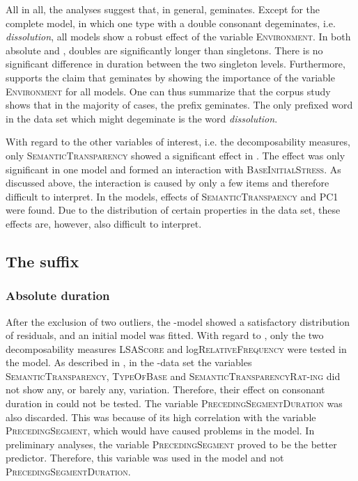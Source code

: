 All in all, the analyses suggest that, in general,  geminates. Except for the complete  model, in which one type with a double consonant degeminates, i.e. \textit{dissolution}, all  models show a robust effect of the variable \textsc{Environment}. In both absolute and , doubles are significantly longer than singletons. There is no significant difference in duration between the two singleton levels. Furthermore,  supports the claim that  geminates by showing the importance of the variable \textsc{Environment} for all models. 
One can thus summarize that the corpus study shows that in the majority of cases, the prefix  geminates. The only prefixed word in the data set which might degeminate is the word \textit{dissolution}.

With regard to the other variables of interest, i.e. the decomposability measures, only \textsc{SemanticTransparency} showed a significant effect in . The effect was only significant in one model and formed an interaction with \textsc{BaseInitialStress}. As discussed above, the interaction is  caused by only a few items and therefore difficult to interpret.
 In the  models, effects of \textsc{SemanticTranspaency} and \textsc{PC1} were found. Due to the distribution of certain properties in the data set, these effects are, however, also difficult to interpret. 


\subsection{The suffix }


\subsubsection{Absolute duration}

After the exclusion of two outliers, the -model showed a satisfactory distribution of residuals, and an initial model was fitted. 
With regard to , only the two decomposability measures \textsc{LSAScore} and log\textsc{RelativeFrequency} were tested in the model. As described in , in the -data set the variables \textsc{SemanticTransparency}, \textsc{TypeOfBase}  and \textsc{SemanticTransparencyRat-ing} did not show any, or barely any, variation. Therefore, their effect on consonant duration in  could not be tested. The variable \textsc{PrecedingSegmentDuration} was also discarded. This was because of its high correlation with the variable \textsc{PrecedingSegment}, which would have caused  problems in the model. In preliminary analyses, the variable \textsc{PrecedingSegment} proved to be the better predictor. Therefore, this variable was used in the model and not \textsc{PrecedingSegmentDuration}. 

